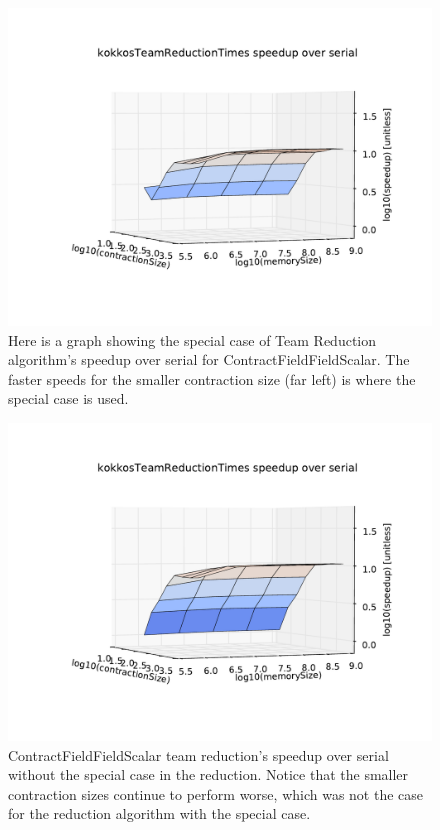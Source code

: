 \begin{figure}[!ht] 
    \centering
    \includegraphics[scale = .8]{kokkosCFFSTeamReductionSpecialCase.pdf}
    \caption{Here is a graph showing the special case of Team Reduction algorithm's speedup over serial for ContractFieldFieldScalar. The faster speeds for the smaller contraction size (far left) is where the special case is used. }
\label{CFFSTeamReduceSpecialCaseGraph}
\end{figure}



\begin{figure}[!ht] 
    \centering
    \includegraphics[scale = .8]{kokkosCFFSTeamReductionNoSpecialCase}
    \caption{ContractFieldFieldScalar team reduction's speedup over serial without the special case in the reduction. Notice that the smaller contraction sizes continue to perform worse, which was not the case for the reduction algorithm with the special case.}
\label{CFFSTeamReduceNoSpecialCaseGraph}
\end{figure}

